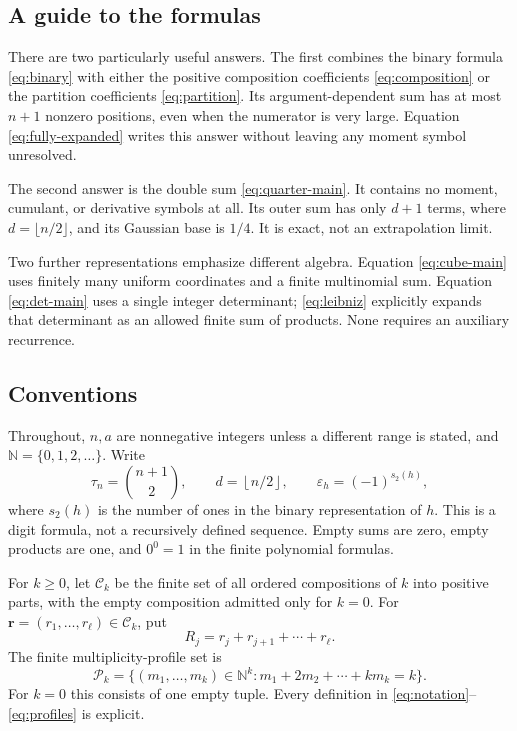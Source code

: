 \documentclass[11pt,a4paper]{article}
\theoremstyle{definition}
\theoremstyle{remark}
\newcommand{\N}{\mathbb N}
\newcommand{\eps}{\varepsilon}
\newcommand{\Comp}{\mathcal C}
\newcommand{\Part}{\mathcal P}
\newcommand{\floor}[1]{\left\lfloor #1\right\rfloor}
\begin{document}
\subsection{A guide to the formulas}
There are two particularly useful answers.  The first combines the binary formula
\eqref{eq:binary} with either the positive composition coefficients
\eqref{eq:composition} or the partition coefficients \eqref{eq:partition}.
Its argument-dependent sum has at most \(n+1\) nonzero positions, even when the
numerator is very large.  Equation \eqref{eq:fully-expanded} writes this answer
without leaving any moment symbol unresolved.

The second answer is the double sum \eqref{eq:quarter-main}.  It contains no moment,
cumulant, or derivative symbols at all.  Its outer sum has only
\(d+1\) terms, where \(d=\lfloor n/2\rfloor\), and its Gaussian base is \(1/4\).
It is exact, not an extrapolation limit.

Two further representations emphasize different algebra.  Equation
\eqref{eq:cube-main} uses finitely many uniform coordinates and a finite
multinomial sum.  Equation \eqref{eq:det-main} uses a single integer determinant;
\eqref{eq:leibniz} explicitly expands that determinant as an allowed finite
sum of products.  None requires an auxiliary recurrence.

\subsection{Conventions}
Throughout, \(n,a\) are nonnegative integers unless a different range is stated,
and \(\N=\{0,1,2,\ldots\}\).  Write
\begin{equation}
 \tau_n=\binom{n+1}{2},\qquad d=\floor{n/2},\qquad
 \eps_h=(-1)^{s_2(h)},                                    \label{eq:notation}
\end{equation}
where \(s_2(h)\) is the number of ones in the binary representation of \(h\).
This is a digit formula, not a recursively defined sequence.  Empty sums are zero,
empty products are one, and \(0^0=1\) in the finite polynomial formulas.

For \(k\geq 0\), let \(\Comp_k\) be the finite set of all ordered compositions of
\(k\) into positive parts, with the empty composition admitted only for \(k=0\).
For \(\mathbf r=(r_1,\ldots,r_\ell)\in\Comp_k\), put
\begin{equation}
 R_j=r_j+r_{j+1}+\cdots+r_\ell.                           \label{eq:suffix}
\end{equation}
The finite multiplicity-profile set is
\begin{equation}
 \Part_k=\{(m_1,\ldots,m_k)\in\N^k:
                  m_1+2m_2+\cdots+km_k=k\}.             \label{eq:profiles}
\end{equation}
For \(k=0\) this consists of one empty tuple.  Every definition in
\eqref{eq:notation}--\eqref{eq:profiles} is explicit.
\end{document}
